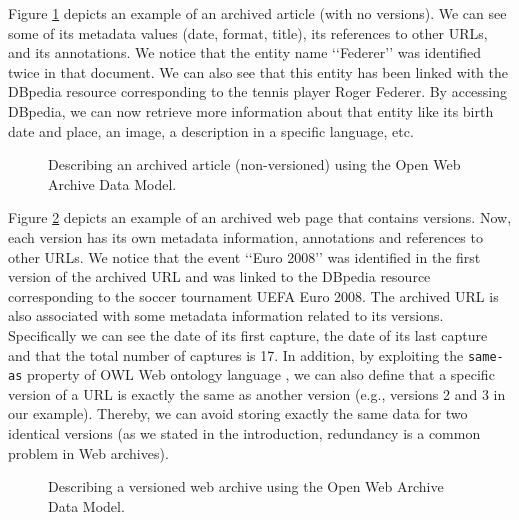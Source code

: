 \documentclass[runningheads,a4paper]{libtex/llncs}
\newcommand{\q}[1]{\lq\lq{}{}#1\rq\rq{}{}}
\begin{document}
Figure \ref{fig:owa_instNonVers} depicts an example of an archived article (with no versions).
We can see some of its metadata values (date, format, title),
its references to other URLs, and its annotations.
We notice that the entity name \q{Federer} was identified twice in that document.
We can also see that this entity has been linked with the DBpedia resource
corresponding to the tennis player Roger Federer.
By accessing DBpedia, we can now retrieve more information about that entity
like its birth date and place, an image, a description in a specific language, etc.

\begin{figure}[htbp]
\vspace{-3mm}
\centerline{}
\vspace{-2mm}
\caption{Describing an archived article (non-versioned) using the Open Web Archive Data Model.}
\label{fig:owa_instNonVers}
\vspace{-3mm}
\end{figure}

Figure \ref{fig:owa_inst} depicts an example of an archived web page that contains versions.
Now, each version has its own metadata information, annotations and references to other URLs.
We notice that the event \q{Euro 2008} was identified in the first version of the archived URL
and was linked to the DBpedia resource corresponding to the soccer tournament UEFA Euro 2008.
The archived URL is also associated with some metadata information related to its versions.
Specifically we can see the date of its first capture, the date of its last capture and
that the total number of captures is 17.
In addition, by exploiting the {\tt same-as} property of OWL Web ontology language \cite{bechhofer2009owl},
we can also define that a specific version of a URL is exactly the same as another version
(e.g., versions 2 and 3 in our example).
Thereby, we can avoid storing exactly the same data for two identical versions
(as we stated in the introduction, redundancy is a common problem in Web archives).

\begin{figure}[htbp]
\vspace{-2mm}
\centerline{}
\vspace{-2mm}
\caption{Describing a versioned web archive using the Open Web Archive Data Model.}
\label{fig:owa_inst}
\end{figure}
\end{document}
